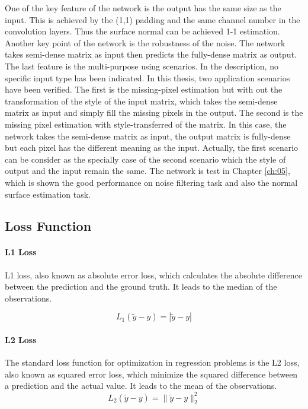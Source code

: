 \documentclass[border=15pt, multi, tikz]{article}
\begin{document}
One of the key feature of the network is the output has the same size as the input. This is achieved by the (1,1) padding and the same channel number in the convolution layers. Thus the surface normal can be achieved 1-1 estimation. Another key point of the network is the robustness of the noise. The network takes semi-dense matrix as input then predicts the fully-dense matrix as output. The last feature is the multi-purpose using scenarios. In the description, no specific input type has been indicated. In this thesis, two application scenarios have been verified. The first is the missing-pixel estimation but with out the transformation of the style of the input matrix, which takes the semi-dense matrix as input and simply fill the missing pixels in the output. The second is the missing pixel estimation with style-transferred of the matrix. In this case, the network takes the semi-dense matrix as input, the output matrix is fully-dense but each pixel has the different meaning as the input. Actually, the first scenario can be consider as the specially case of the second scenario which the style of output and the input remain the same. The network is test in Chapter \ref{ch:05}, which is shown the good performance on noise filtering task and also the normal surface estimation task.

\subsection{Loss Function}

\paragraph{L1 Loss}
L1 loss, also known as absolute error loss, which calculates the absolute difference between the prediction and the ground truth. It leads to the median of the observations.

\[ L_1(\tilde y - y) = |\tilde y - y | \]

\paragraph{L2 Loss}
The standard loss function for optimization in regression problems is the L2 loss, also known as squared error loss, which minimize the squared difference between a prediction and the actual value. It leads to the mean of the observations. 
\[ L_2(\tilde y - y) = \|\tilde y - y \|_2^2 \]
\end{document}

